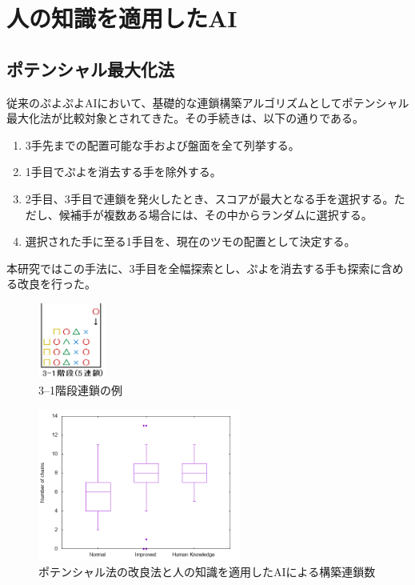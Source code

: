 \documentclass[twocolumn, a4paper]{UECIEresume}
\begin{document}
\section{人の知識を適用したAI}
\subsection{ポテンシャル最大化法}
従来のぷよぷよAIにおいて、基礎的な連鎖構築アルゴリズムとしてポテンシャル最大化法が比較対象とされてきた\cite{puyo_temp, puyo_monte}。その手続きは、以下の通りである。
\begin{enumerate}
\item 3手先までの配置可能な手および盤面を全て列挙する。
\item 1手目でぷよを消去する手を除外する。
\item 2手目、3手目で連鎖を発火したとき、スコアが最大となる手を選択する。ただし、候補手が複数ある場合には、その中からランダムに選択する。
\item 選択された手に至る1手目を、現在のツモの配置として決定する。
\end{enumerate}

本研究ではこの手法に、3手目を全幅探索とし、ぷよを消去する手も探索に含める改良を行った。


\begin{figure}[ht]
  \begin{center}
  \includegraphics[height=2.5cm]{kaidan.png}
  \caption{3--1階段連鎖の例} \label{fig:kaidan}
\end{center}
\end{figure}


\begin{figure}[ht]
  \begin{center}
  \includegraphics[height=5cm]{../happyou/graph/chain.png}
  \caption{ポテンシャル法の改良法と人の知識を適用したAIによる構築連鎖数} \label{fig:chain}
\end{center}
\end{figure}
\end{document}
